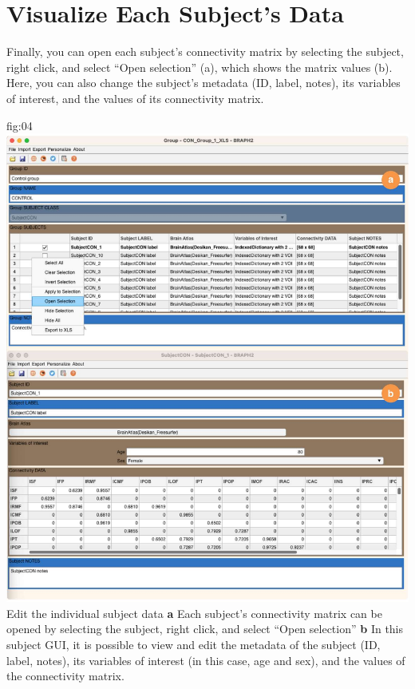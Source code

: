 \documentclass[justified]{tufte-handout}
\begin{document}

\section{Visualize Each Subject's Data}

Finally, you can open each subject's connectivity matrix by selecting the subject, right click, and select ``Open selection'' (a), which shows the matrix values (b). Here, you can also change the subject's metadata (ID, label, notes), its variables of interest, and the values of its connectivity matrix.

	{fig:04}
	{\includegraphics{fig04.jpg}
	}
	{Edit the individual subject data}
	{
	{\bf a}  Each subject's connectivity matrix can be opened by selecting the subject, right click, and select ``Open selection''
	{\bf b} In this subject GUI, it is possible to view and edit the metadata of the subject (ID, label, notes), its variables of interest (in this case, age and sex), and the values of the connectivity matrix. 
	}

\end{document}
